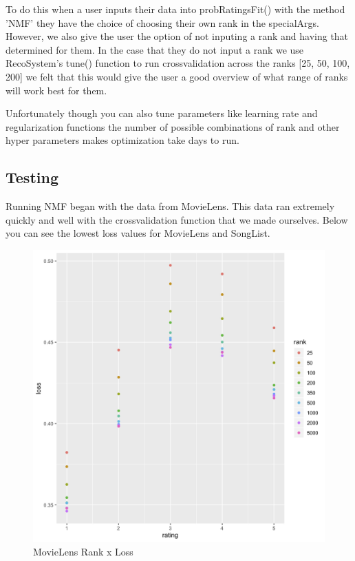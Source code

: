 \documentclass{article}
\begin{document}
To do this when a user inputs their data into probRatingsFit() with the method 'NMF' they have the choice of choosing their own rank in the specialArgs. However, we also give the user the option of not inputing a rank and having that determined for them. In the case that they do not input a rank we use RecoSystem's tune() function to run crossvalidation across the ranks [25, 50, 100, 200] we felt that this would give the user a good overview of what range of ranks will work best for them. 

Unfortunately though you can also tune parameters like learning rate and regularization functions the number of possible combinations of rank and other hyper parameters makes optimization take days to run.

\subsection{Testing}

Running NMF began with the data from MovieLens. This data ran extremely quickly and well with the crossvalidation function that we made ourselves. Below you can see the lowest loss values for MovieLens and SongList.

\begin{figure}[ht]
\centering
\includegraphics[scale=0.3]{FinalNMFMovie.png}
\caption{MovieLens Rank x Loss}
\label{fig:universe}
\end{figure}
\end{document}
